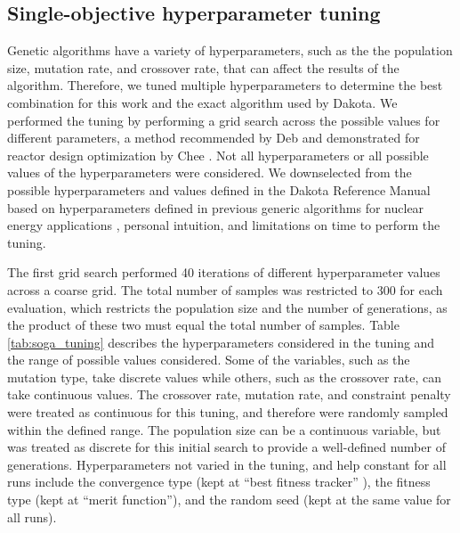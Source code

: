 \subsection{Single-objective hyperparameter tuning}
Genetic algorithms have a variety of hyperparameters, such as the the 
population size, mutation rate, and crossover rate, that can affect 
the results of the algorithm. Therefore, we tuned multiple hyperparameters
to determine the best combination for this work and the exact algorithm 
used by Dakota. We performed the tuning by performing a grid search across 
the possible values for different parameters, a method recommended 
by Deb \cite{deb_multi-objective_2001} and demonstrated for reactor 
design optimization by Chee \cite{chee_fluoride-salt-cooled_2022}. 
Not all hyperparameters or all possible values of the hyperparameters 
were considered. We downselected from 
the possible hyperparameters and values defined in the Dakota Reference 
Manual based on hyperparameters defined in previous generic algorithms 
for nuclear energy applications
\cite{passerini_systematic_2014,chee_fluoride-salt-cooled_2022},
personal intuition, and limitations on time to perform 
the tuning.

The 
first grid search performed 40 iterations of different hyperparameter 
values across a coarse grid. The total number of samples was restricted to 
300 for each evaluation, which restricts the population size and the 
number of generations, as the product of these two must equal the 
total number of samples. Table \ref{tab:soga_tuning} describes 
the hyperparameters considered in the tuning and the range of possible 
values considered. Some of the variables, such as the mutation 
type, take discrete values while others, such as the crossover 
rate, can take continuous values. The crossover rate, mutation 
rate, and constraint penalty were treated as continuous for this 
tuning, and therefore were randomly sampled within the defined range. 
The population size can be a continuous variable, but was 
treated as discrete for this initial search to provide a well-defined 
number of generations. Hyperparameters not varied in the tuning, and 
help constant for all runs include the convergence type (kept at
``best fitness tracker'' ), the fitness type (kept at ``merit function''),
and the random seed (kept at the same value for all runs).

